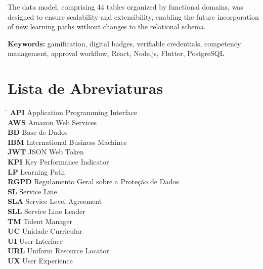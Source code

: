 \documentclass[12pt,a4paper]{report}
\begin{document}
The data model, comprising 44 tables organized by functional domains, was designed to ensure scalability and extensibility, enabling the future incorporation of new learning paths without changes to the relational schema.

\vspace{1cm}
\noindent\textbf{Keywords:} gamification, digital badges, verifiable credentials, competency management, approval workflow, React, Node.js, Flutter, PostgreSQL

\newpage

\chapter*{Lista de Abreviaturas}

\begin{tabbing}
  \hspace{3cm}\= \kill
  \textbf{API}  \> Application Programming Interface \\[4pt]
  \textbf{AWS}  \> Amazon Web Services \\[4pt]
  \textbf{BD}   \> Base de Dados \\[4pt]
  \textbf{IBM}  \> International Business Machines \\[4pt]
  \textbf{JWT}  \> JSON Web Token \\[4pt]
  \textbf{KPI}  \> Key Performance Indicator \\[4pt]
  \textbf{LP}   \> Learning Path \\[4pt]
  \textbf{RGPD} \> Regulamento Geral sobre a Proteção de Dados \\[4pt]
  \textbf{SL}   \> Service Line \\[4pt]
  \textbf{SLA}  \> Service Level Agreement \\[4pt]
  \textbf{SLL}  \> Service Line Leader \\[4pt]
  \textbf{TM}   \> Talent Manager \\[4pt]
  \textbf{UC}   \> Unidade Curricular \\[4pt]
  \textbf{UI}   \> User Interface \\[4pt]
  \textbf{URL}  \> Uniform Resource Locator \\[4pt]
  \textbf{UX}   \> User Experience \\
\end{tabbing}
\end{document}

